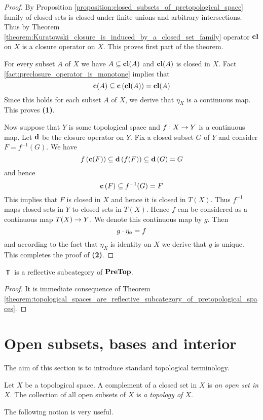 \begin{proof}
	By Proposition \ref{proposition:closed_subsets_of_pretopological_space} family of closed sets is closed under finite unions and arbitrary intersections. Thus by Theorem \ref{theorem:Kuratowski_closure_is_induced_by_a_closed_set_family} operator $\mathbf{cl}$ on $X$ is a closure operator on $X$. This proves first part of the theorem.

	For every subset $A$ of $X$ we have $A \subseteq \mathbf{cl}(A)$ and $\mathbf{cl}(A)$ is closed in $X$. Fact \ref{fact:preclosure_operator_is_monotone} implies that
	$$\mathbf{c}(A) \subseteq \mathbf{c}\left(\mathbf{cl}(A)\right) = \mathbf{cl}(A)$$
	Since this holds for each subset $A$ of $X$, we derive that $\eta_{X}$ is a continuous map. This proves \textbf{(1)}.

	Now suppose that $Y$ is some topological space and $f:X \rightarrow Y$ is a continuous map. Let $\mathbf{d}$ be the closure operator on $Y$. Fix a closed subset $G$ of $Y$ and consider $F = f^{-1}(G)$. We have
	$$f\left(\mathbf{c}(F)\right) \subseteq \mathbf{d}\left(f(F)\right) \subseteq \mathbf{d}\left(G\right) = G$$
	and hence
	$$\mathbf{c}\left(F\right) \subseteq f^{-1}(G) = F$$
	This implies that $F$ is closed in $X$ and hence it is closed in $T(X)$. Thus $f^{-1}$ maps closed sets in $Y$ to closed sets in $T(X)$. Hence $f$ can be considered as a continuous map $T(X) \rightarrow Y$. We denote this continuous map by $g$. Then
	$$g\cdot \eta_{\mathbf{c}} = f$$
	and according to the fact that $\eta_{X}$ is identity on $X$ we derive that $g$ is unique. This completes the proof of \textbf{(2)}.
\end{proof}

\begin{corollary}\label{corollary:top_is_reflective_in_pretop}
	$\Top$ is a reflective subcategory of $\mathbf{PreTop}$.
\end{corollary}
\begin{proof}
	It is immediate consequence of Theorem \ref{theorem:topological_spaces_are_reflective_subcategory_of_pretopological_spaces}.
\end{proof}


\section{Open subsets, bases and interior}
\noindent
The aim of this section is to introduce standard topological terminology.

\begin{definition}
	Let $X$ be a topological space. A complement of a closed set in $X$ is \textit{an open set in $X$}. The collection of all open subsets of $X$ is \textit{a topology of $X$}.
\end{definition}
\noindent
The following notion is very useful.

